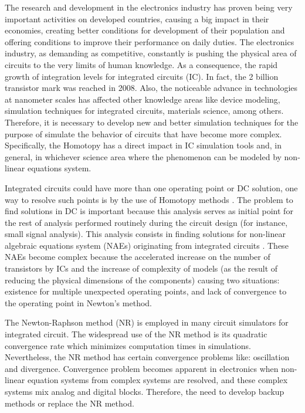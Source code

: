 \documentclass[conference,letterpaper,onecolumn]{IEEEtran}
\begin{document}
The research and development in the electronics industry has proven being very important activities on developed countries, causing a big impact in their economies, creating better conditions for development of their population and offering conditions to improve their performance on daily duties. The electronics industry, as demanding as competitive, constantly is pushing the physical area of circuits to the very limits of human knowledge. As a consequence, the rapid growth of integration levels for integrated circuits (IC). In fact, the 2 billion transistor mark was reached in 2008. Also, the noticeable advance in technologies at nanometer scales has affected other knowledge areas like device modeling, simulation techniques for integrated circuits, materials science, among others. Therefore, it is necessary to develop new and better simulation techniques for the purpose of simulate the behavior of circuits that have become more complex. Specifically, the Homotopy has a direct impact in IC simulation tools and, in general, in whichever science area where the phenomenon can be modeled by non-linear equations system.

Integrated circuits could have more than one operating point or DC solution, one way to resolve such points is by the use of Homotopy methods \cite{cont_chu1}. The problem to find solutions in DC is important because this analysis serves as initial point for the rest of analysis performed routinely during the circuit design (for instance, small signal analysis)\cite{homo_ogrodzki}. This analysis consists in finding solutions for non-linear algebraic equations system (NAEs) originating from integrated circuits \cite{Schwa_book}. These NAEs become complex because the accelerated increase on the number of transistors by ICs and the increase of complexity of models (as the result of reducing the physical dimensions of the components) causing two situations: existence for multiple unexpected operating points, and lack of convergence to the operating point in Newton's method.

The Newton-Raphson method (NR) is employed in many circuit simulators for integrated circuit. The widespread use of the NR method is its quadratic convergence rate \cite{homo_ogrodzki,cont_quasi} which minimizes computation times in simulations. Nevertheless, the NR method has certain convergence problems \cite{cont_quasi,Schwa_book} like: oscillation and divergence. Convergence problem becomes apparent in electronics when non-linear equation systems from complex systems are resolved, and these complex systems mix analog and digital blocks. Therefore, the need to develop backup methods or replace the NR method.
\end{document}
